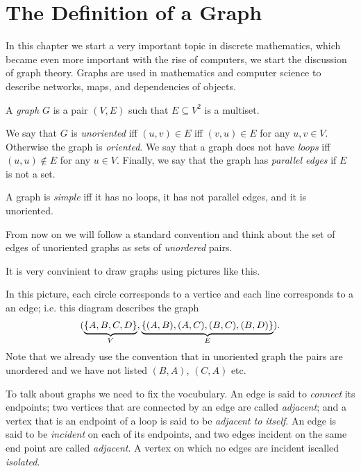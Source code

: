 \chapter{The Definition of a Graph}
In this chapter we start a very important topic in discrete mathematics, which
became even more important with the rise of computers, we start the discussion
of graph theory. Graphs are used in mathematics and computer science to describe
networks, maps, and dependencies of objects.

\begin{definition}
  A \emph{graph} $G$ is a pair $(V, E)$ such that $E \subseteq V^2$ is a multiset.

  We say that $G$ is \emph{unoriented} iff $(u, v) \in E$ iff $(v, u) \in E$ for
  any $u, v \in V$. Otherwise the graph is \emph{oriented}.
  We say that a graph does not have \emph{loops} iff $(u, u) \notin E$ for any
  $u \in V$. Finally, we say that the graph has \emph{parallel edges} if
  $E$ is not a set.
\end{definition}
A graph is \emph{simple} iff it has no loops, it has not parallel edges, and
it is unoriented.

From now on we will follow a standard convention and think about the set of
edges of unoriented graphs as sets of \emph{unordered} pairs.

It is very convinient to draw graphs using pictures like this.
\begin{center}
\end{center}
In this picture, each circle corresponds to a vertice and each line corresponds
to a an edge; i.e. this diagram describes the graph
\[
  (\underbrace{\set{A, B, C, D}}_V,
  \underbrace{\set{(A, B), (A, C), (B, C), (B, D)}}_E).
\]
Note that we already use the convention that in unoriented graph the pairs are
unordered and we have not listed $(B, A)$, $(C, A)$ etc.

To talk about graphs we need to fix the vocubulary.
An edge is said to \emph{connect} its endpoints; two vertices that are
connected by an edge are called \emph{adjacent}; and a vertex that is an
endpoint of a loop is said to be \emph{adjacent to itself}. An edge is said to
be \emph{incident} on each of its endpoints, and two edges incident
on the same end point are called \emph{adjacent}. A vertex on which no edges
are incident iscalled \emph{isolated}.

